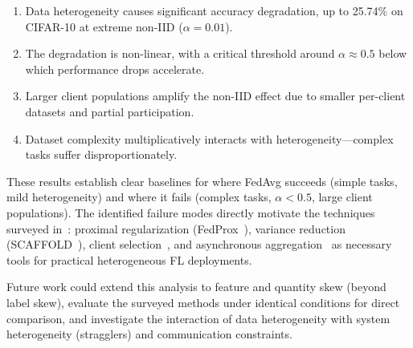 \documentclass[journal]{IEEEtran}
\begin{document}
\begin{enumerate}
    \item Data heterogeneity causes significant accuracy degradation, up to 25.74\% on CIFAR-10 at extreme non-IID ($\alpha=0.01$).
    \item The degradation is non-linear, with a critical threshold around $\alpha \approx 0.5$ below which performance drops accelerate.
    \item Larger client populations amplify the non-IID effect due to smaller per-client datasets and partial participation.
    \item Dataset complexity multiplicatively interacts with heterogeneity---complex tasks suffer disproportionately.
\end{enumerate}

These results establish clear baselines for where FedAvg succeeds (simple tasks, mild heterogeneity) and where it fails (complex tasks, $\alpha < 0.5$, large client populations). The identified failure modes directly motivate the techniques surveyed in~\cite{chen2025advances}: proximal regularization (FedProx~\cite{li2020federated}), variance reduction (SCAFFOLD~\cite{karimireddy2020scaffold}), client selection~\cite{lai2021oort}, and asynchronous aggregation~\cite{nguyen2022federated,wang2025decentralized} as necessary tools for practical heterogeneous FL deployments.

Future work could extend this analysis to feature and quantity skew (beyond label skew), evaluate the surveyed methods under identical conditions for direct comparison, and investigate the interaction of data heterogeneity with system heterogeneity (stragglers) and communication constraints.




\end{document}

